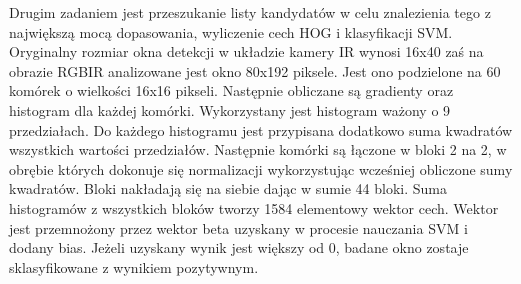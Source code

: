 Drugim zadaniem jest przeszukanie listy kandydatów w celu znalezienia tego z największą mocą dopasowania, wyliczenie cech HOG i klasyfikacji SVM. 
Oryginalny rozmiar okna detekcji w układzie kamery IR wynosi 16x40 zaś na obrazie RGBIR analizowane jest okno 80x192 piksele. 
Jest ono podzielone na 60 komórek o wielkości 16x16 pikseli. 
Następnie obliczane są gradienty oraz histogram dla każdej komórki. 
Wykorzystany jest histogram ważony o 9 przedziałach. %
Do każdego histogramu jest przypisana dodatkowo suma kwadratów wszystkich wartości przedziałów. %
Następnie komórki są łączone w bloki 2 na 2, w obrębie których dokonuje się normalizacji wykorzystując wcześniej obliczone sumy kwadratów. 
Bloki nakładają się na siebie dając w sumie 44 bloki. %
Suma histogramów z wszystkich bloków tworzy 1584 elementowy wektor cech. 
Wektor jest przemnożony przez wektor beta uzyskany w procesie nauczania SVM i dodany bias. %
Jeżeli uzyskany wynik jest większy od 0, badane okno zostaje sklasyfikowane z wynikiem pozytywnym.



